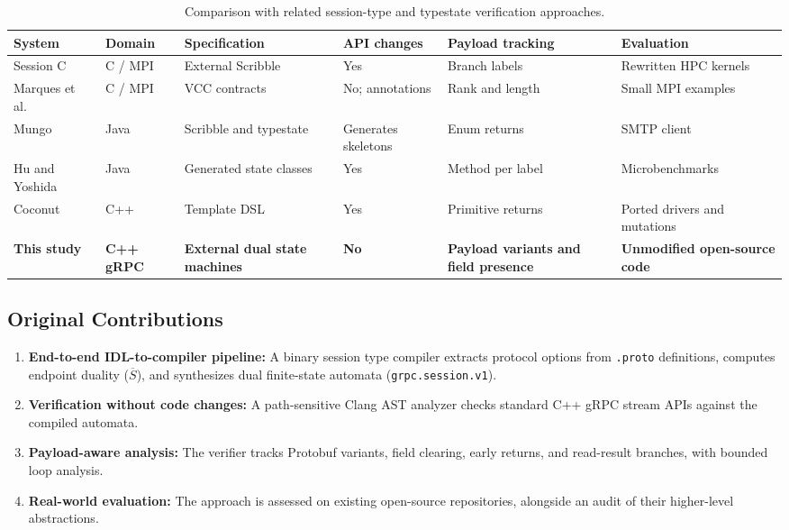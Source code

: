 \documentclass[11pt,a4paper]{article}
\begin{document}
\begin{table}[htbp]
\centering
\small
\begin{tabular}{@{}p{2.3cm}p{1.6cm}p{2.5cm}p{2.0cm}p{2.3cm}p{2.5cm}@{}}
\toprule
\textbf{System} & \textbf{Domain} & \textbf{Specification} & \textbf{API changes} & \textbf{Payload tracking} & \textbf{Evaluation} \\
\midrule
Session C~\cite{ng-yoshida-honda-2012-cc} & C / MPI & External Scribble & Yes & Branch labels & Rewritten HPC kernels \\
Marques et al.~\cite{marques-et-al-2013} & C / MPI & VCC contracts & No; annotations & Rank and length & Small MPI examples \\
Mungo~\cite{kouzapas-et-al-2016} & Java & Scribble and typestate & Generates skeletons & Enum returns & SMTP client \\
Hu and Yoshida~\cite{hu-yoshida-2016} & Java & Generated state classes & Yes & Method per label & Microbenchmarks \\
Coconut~\cite{alsubhi-et-al-2025} & C++ & Template DSL & Yes & Primitive returns & Ported drivers and mutations \\
\textbf{This study} & \textbf{C++ gRPC} & \textbf{External dual state machines} & \textbf{No} & \textbf{Payload variants and field presence} & \textbf{Unmodified open-source code} \\
\bottomrule
\end{tabular}
\caption{Comparison with related session-type and typestate verification approaches.}
\label{tab:comparison}
\end{table}

\subsection{Original Contributions}
\begin{enumerate}
    \item \textbf{End-to-end IDL-to-compiler pipeline:} A binary session type compiler extracts protocol options from \texttt{.proto} definitions, computes endpoint duality ($\overline{S}$), and synthesizes dual finite-state automata (\texttt{grpc.session.v1}).
    \item \textbf{Verification without code changes:} A path-sensitive Clang AST analyzer checks standard C++ gRPC stream APIs against the compiled automata.
    \item \textbf{Payload-aware analysis:} The verifier tracks Protobuf variants, field clearing, early returns, and read-result branches, with bounded loop analysis.
    \item \textbf{Real-world evaluation:} The approach is assessed on existing open-source repositories, alongside an audit of their higher-level abstractions.
\end{enumerate}
\end{document}
